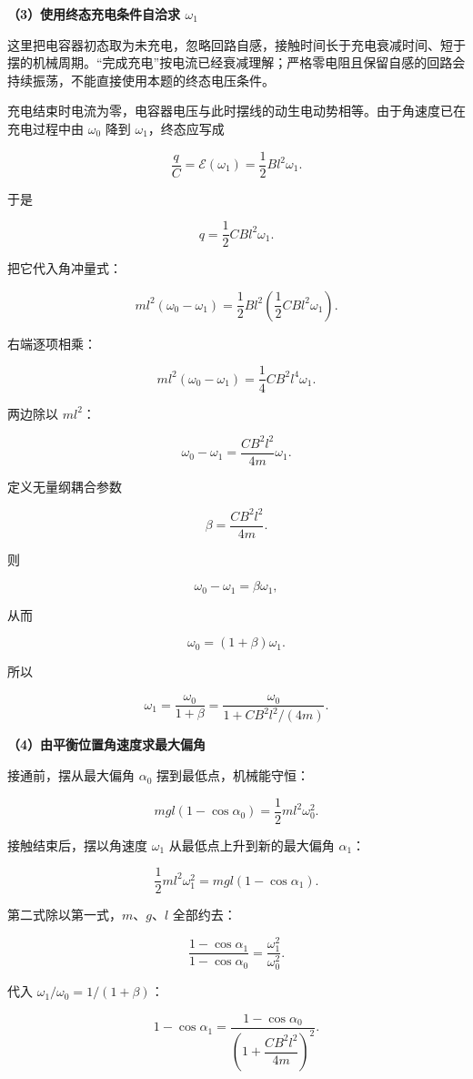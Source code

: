 \documentclass[12pt,a4paper,UTF8]{ctexart}
\begin{document}
\textbf{（3）使用终态充电条件自洽求 \(\omega_1\)}

这里把电容器初态取为未充电，忽略回路自感，接触时间长于充电衰减时间、短于摆的机械周期。``完成充电''按电流已经衰减理解；严格零电阻且保留自感的回路会持续振荡，不能直接使用本题的终态电压条件。

充电结束时电流为零，电容器电压与此时摆线的动生电动势相等。由于角速度已在充电过程中由
\(\omega_0\) 降到 \(\omega_1\)，终态应写成

\[
\frac qC=\mathcal E(\omega_1)
=\frac12Bl^2\omega_1.
\]

于是

\[
\boxed{q=\frac12CBl^2\omega_1}.
\]

把它代入角冲量式：

\[
ml^2(\omega_0-\omega_1)
=\frac12Bl^2\left(\frac12CBl^2\omega_1\right).
\]

右端逐项相乘：

\[
ml^2(\omega_0-\omega_1)
=\frac14CB^2l^4\omega_1.
\]

两边除以 \(ml^2\)：

\[
\omega_0-\omega_1
=\frac{CB^2l^2}{4m}\omega_1.
\]

定义无量纲耦合参数

\[
\beta=\frac{CB^2l^2}{4m}.
\]

则

\[\omega_0-\omega_1=\beta\omega_1,\]

从而

\[\omega_0=(1+\beta)\omega_1.\]

所以

\[
\boxed{
\omega_1=\frac{\omega_0}{1+\beta}
=\frac{\omega_0}{1+CB^2l^2/(4m)}
}.
\]

\textbf{（4）由平衡位置角速度求最大偏角}

接通前，摆从最大偏角 \(\alpha_0\) 摆到最低点，机械能守恒：

\[
mgl(1-\cos\alpha_0)=\frac12ml^2\omega_0^2.
\]

接触结束后，摆以角速度 \(\omega_1\) 从最低点上升到新的最大偏角
\(\alpha_1\)：

\[
\frac12ml^2\omega_1^2=mgl(1-\cos\alpha_1).
\]

第二式除以第一式，\(m\)、\(g\)、\(l\) 全部约去：

\[
\frac{1-\cos\alpha_1}{1-\cos\alpha_0}
=\frac{\omega_1^2}{\omega_0^2}.
\]

代入 \(\omega_1/\omega_0=1/(1+\beta)\)：

\[
\boxed{
1-\cos\alpha_1
=\frac{1-\cos\alpha_0}
{\left(1+\dfrac{CB^2l^2}{4m}\right)^2}
}.
\]
\end{document}
